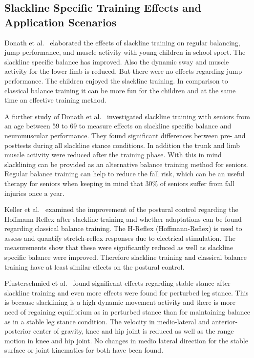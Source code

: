 \subsection{Slackline Specific Training Effects and Application Scenarios}

Donath et al.~\cite{Donath2013-kk} elaborated the effects of slackline training on regular balancing, jump performance, and muscle activity with young children in school sport. The slackline specific balance has improved. Also the dynamic sway and muscle activity for the lower limb is reduced. But there were no effects regarding jump performance. The children enjoyed the slackline training. In comparison to classical balance training it can be more fun for the children and at the same time an effective training method.

A further study of Donath et al.~\cite{Donath2016-gm} investigated slackline training with seniors from an age between 59 to 69 to measure effects on slackline specific balance and neuromuscular performance. They found significant differences between pre- and posttests during all slackline stance conditions. In addition the trunk and limb muscle activity were reduced after the training phase. With this in mind slacklining can be provided as an alternative balance training method for seniors. Regular balance training can help to reduce the fall risk, which can be an useful therapy for seniors when keeping in mind that 30\% of seniors suffer from fall injuries once a year.

Keller et al.~\cite{Keller2012-xh} examined the improvement of the postural control regarding the Hoffmann-Reflex after slackline training and whether adaptations can be found regarding classical balance training. The H-Reflex (Hoffmann-Reflex) is used to assess and quantify stretch-reflex responses due to electrical stimulation. The measurements show that these were significantly reduced as well as slackline specific balance were improved. Therefore slackline training and classical balance training have at least similar effects on the postural control.

Pfusterschmied et al.~\cite{Pfusterschmied2013-yy} found significant effects regarding stable stance after slackline training and even more effects were found for perturbed leg stance. This is because slacklining is a high dynamic movement activity and there is more need of regaining equilibrium as in perturbed stance than for maintaining balance as in a stable leg stance condition. The velocity in medio-lateral and anterior-posterior center of gravity, knee and hip joint is reduced as well as the range motion in knee and hip joint. No changes in medio lateral direction for the stable surface or joint kinematics for both have been found.

